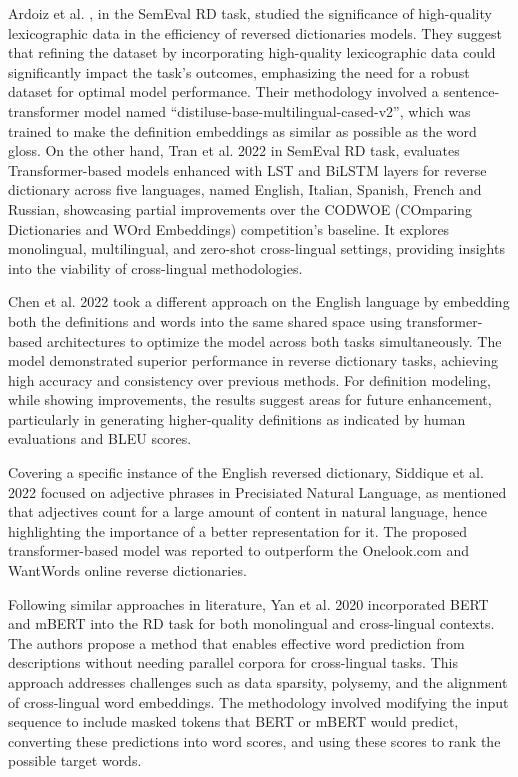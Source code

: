 \documentclass[15pt]{article}
\begin{document}
Ardoiz et al. \cite{Ardoiz2022}, in the SemEval RD task, studied the significance of high-quality lexicographic data in the efficiency of reversed dictionaries models. They suggest that refining the dataset by incorporating high-quality lexicographic data could significantly impact the task's outcomes, emphasizing the need for a robust dataset for optimal model performance. Their methodology involved a sentence-transformer model named “distiluse-base-multilingual-cased-v2”, which was trained to make the definition embeddings as similar as possible as the word gloss.
On the other hand, Tran et al. 2022 in SemEval RD task, evaluates Transformer-based models enhanced with LST and BiLSTM layers for reverse dictionary across five languages, named English, Italian, Spanish, French and Russian, showcasing partial improvements over the CODWOE (COmparing Dictionaries and WOrd Embeddings) competition's baseline. It explores monolingual, multilingual, and zero-shot cross-lingual settings, providing insights into the viability of cross-lingual methodologies.

Chen et al. 2022 took a different approach on the English language by embedding both the definitions and words into the same shared space using transformer-based architectures to optimize the model across both tasks simultaneously. The model demonstrated superior performance in reverse dictionary tasks, achieving high accuracy and consistency over previous methods. For definition modeling, while showing improvements, the results suggest areas for future enhancement, particularly in generating higher-quality definitions as indicated by human evaluations and BLEU scores.

Covering a specific instance of the English reversed dictionary, Siddique et al. 2022 focused on adjective phrases in Precisiated Natural Language, as mentioned that adjectives count for a large amount of content in natural language, hence highlighting the importance of a better representation for it. The proposed transformer-based model was reported to outperform the Onelook.com and WantWords online reverse dictionaries.

Following similar approaches in literature, Yan et al. 2020 incorporated BERT and mBERT into the RD task for both monolingual and cross-lingual contexts. The authors propose a method that enables effective word prediction from descriptions without needing parallel corpora for cross-lingual tasks. This approach addresses challenges such as data sparsity, polysemy, and the alignment of cross-lingual word embeddings. The methodology involved modifying the input sequence to include masked tokens that BERT or mBERT would predict, converting these predictions into word scores, and using these scores to rank the possible target words.
\end{document}
